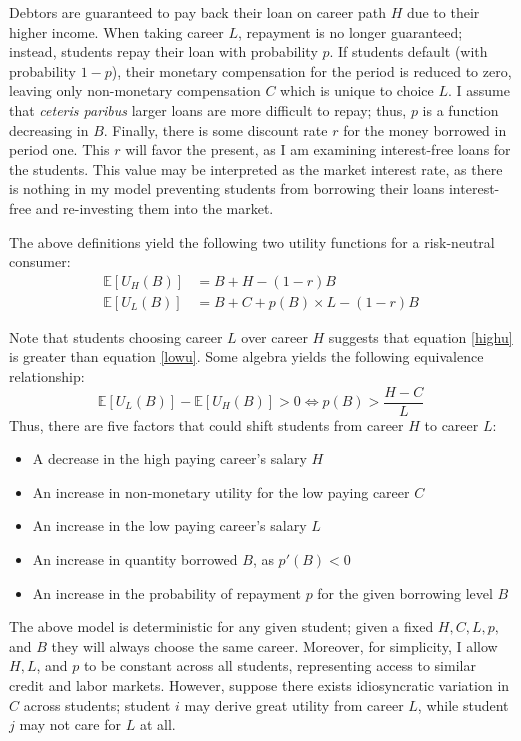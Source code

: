 \documentclass[12pt]{article}
\begin{document}
	Debtors are guaranteed to pay back their loan on career path $H$ due to their higher income. When taking career $L$, repayment is no longer guaranteed; instead, students repay their loan with probability $p$. If students default (with probability $1 - p$), their monetary compensation for the period is reduced to zero, leaving only non-monetary compensation $C$ which is unique to choice $L$. I assume that \emph{ceteris paribus} larger loans are more difficult to repay; thus, $p$ is a function decreasing in $B$. Finally, there is some discount rate $r$ for the money borrowed in period one. This $r$ will favor the present, as I am examining interest-free loans for the students. This value may be interpreted as the market interest rate, as there is nothing in my model preventing students from borrowing their loans interest-free and re-investing them into the market. 
	
	The above definitions yield the following two utility functions for a risk-neutral consumer: 
	\begin{align}
	\mathbb{E}\left[U_H(B)\right] &= B + H - (1 - r)B \label{highu}\\
	\mathbb{E}\left[U_L(B)\right] &= B + C + p(B) \times L - (1 - r)B \label{lowu}
	\end{align}
	
	Note that students choosing career $L$ over career $H$ suggests that equation \ref{highu} is greater than equation \ref{lowu}. Some algebra yields the following equivalence relationship: 
	\begin{equation}
	\mathbb{E}\left[U_L(B)\right] - \mathbb{E}\left[U_H(B)\right] > 0 \iff p(B) > \frac{H - C}{L} \label{choicecon}
	\end{equation} 
	Thus, there are five factors that could shift students from career $H$ to career $L$:
	\begin{itemize}
		\singlespacing
		\item A decrease in the high paying career's salary $H$
		\item An increase in non-monetary utility for the low paying career $C$
		\item An increase in the low paying career's salary $L$
		\item An increase in quantity borrowed $B$, as $p'(B) < 0$
		\item An increase in the probability of repayment $p$ for the given borrowing level $B$
	\end{itemize}

	The above model is deterministic for any given student; given a fixed $H, C, L, p,$ and $B$ they will always choose the same career. Moreover, for simplicity, I allow $H, L$, and $p$ to be constant across all students, representing access to similar credit and labor markets. However, suppose there exists idiosyncratic variation in $C$ across students; student $i$ may derive great utility from career $L$, while student $j$ may not care for $L$ at all.
\end{document}
